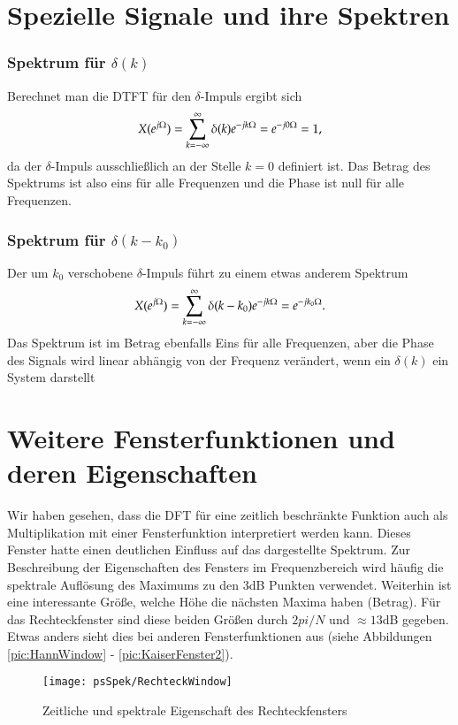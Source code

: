 \section{Spezielle Signale und ihre Spektren}

\subsubsection{Spektrum für $\delta(k)$}
Berechnet man die DTFT für den $\delta$-Impuls ergibt sich
\begin{equation}\label{eq:SpektrumDeltaImpuls}
    X (e^{j\Omega}) = \sum_{k = -\infty}^{\infty} \delta(k)e^{-jk \Omega} =e^{-j0 \Omega} = 1,
\end{equation}
da der $\delta$-Impuls ausschließlich an der Stelle $k = 0$ definiert ist.
Das Betrag des Spektrums ist also eins für alle Frequenzen und die Phase ist null
für alle Frequenzen.

\subsubsection{Spektrum für $\delta(k-k_0)$}
Der um $k_0$ verschobene $\delta$-Impuls führt zu einem etwas anderem Spektrum
\begin{equation}\label{eq:SpektrumDeltaImpuls}
    X (e^{j\Omega}) = \sum_{k = -\infty}^{\infty} \delta(k-k_0)e^{-jk \Omega} =e^{-jk_0 \Omega}.
\end{equation}
Das Spektrum ist im Betrag ebenfalls Eins für alle Frequenzen, aber die Phase des Signals
wird linear abhängig von der Frequenz verändert, wenn ein $\delta(k)$ ein System darstellt



\section{Weitere Fensterfunktionen und deren Eigenschaften}
Wir haben gesehen, dass die DFT für eine zeitlich beschränkte
Funktion auch als Multiplikation mit einer Fensterfunktion
interpretiert werden kann. Dieses Fenster hatte einen deutlichen
Einfluss auf das dargestellte Spektrum. Zur Beschreibung der
Eigenschaften des Fensters im Frequenzbereich wird häufig die
spektrale Auflösung des Maximums zu den 3dB Punkten verwendet.
Weiterhin ist eine interessante Größe, welche Höhe die nächsten
Maxima haben (Betrag). Für das Rechteckfenster sind diese beiden
Größen durch $2pi/N$ und $\approx 13$dB gegeben. Etwas anders sieht
dies bei anderen Fensterfunktionen aus (siehe Abbildungen
\ref{pic:HannWindow} - \ref{pic:KaiserFenster2}).
\begin{figure}[H]
\begin{center}
\texttt{[image: psSpek/RechteckWindow]}
\caption{\label{pic:RectWindow}Zeitliche und spektrale Eigenschaft
des Rechteckfensters}
\end{center}
\end{figure}

